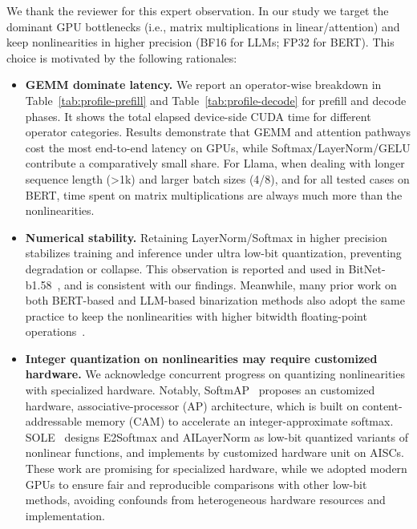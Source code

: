 \begin{revresponse}[]



We thank the reviewer for this expert observation. In our study we target the dominant GPU bottlenecks (i.e., matrix multiplications in linear/attention) and keep nonlinearities in higher precision (BF16 for LLMs; FP32 for BERT). This choice is motivated by the following rationales: 
\begin{itemize}
    \item \textbf{GEMM dominate latency. } We report an operator-wise breakdown in Table~\ref{tab:profile-prefill} and Table~\ref{tab:profile-decode} for prefill and decode phases. It shows the total elapsed device-side CUDA time for different operator categories. 
    Results demonstrate that GEMM and attention pathways cost the most end-to-end latency on GPUs, while Softmax/LayerNorm/GELU contribute a comparatively small share. For Llama, when dealing with longer sequence length (>1k) and larger batch sizes (4/8), and for all tested cases on BERT, time spent on matrix multiplications are always much more than the nonlinearities. 
    \item \textbf{Numerical stability.} Retaining LayerNorm/Softmax in higher precision stabilizes training and inference under ultra low-bit quantization, preventing degradation or collapse. This observation is reported and used in BitNet-b1.58~\cite{wang2023bitnet}, and is consistent with our findings. Meanwhile, many prior work on both BERT-based and LLM-based binarization methods also adopt the same practice to keep the nonlinearities with higher bitwidth floating-point operations~\cite{liu2022bit, qin2022bibert, huang2024billm, shang2023pbllm}. 
    \item \textbf{Integer quantization on nonlinearities may require customized hardware.} We acknowledge concurrent progress on quantizing nonlinearities with specialized hardware. Notably, SoftmAP~\cite{rakka2024} proposes an customized hardware, associative-processor (AP) architecture, which is built on content-addressable memory (CAM) to accelerate an integer-approximate softmax. SOLE~\cite{sole} designs E2Softmax and AILayerNorm as low-bit quantized variants of nonlinear functions, and implements by customized hardware unit on AISCs.  These work are promising for specialized hardware, while we adopted modern GPUs to ensure fair and reproducible comparisons with other low-bit methods, avoiding confounds from heterogeneous hardware resources and implementation. 
\end{itemize}


\end{revresponse}
